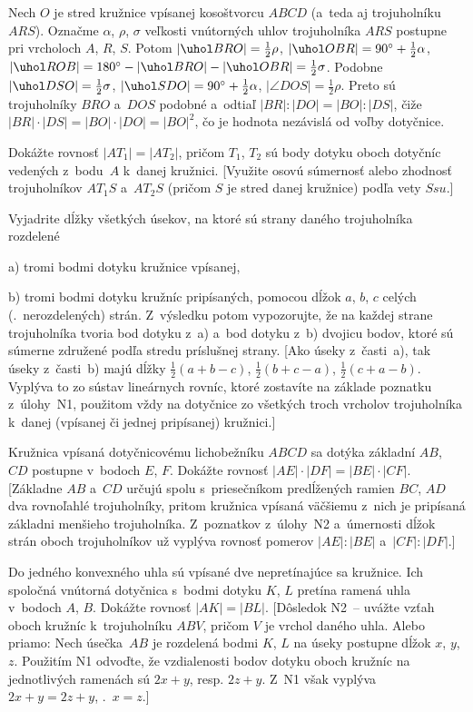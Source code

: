 {\ineriesenie
Nech $O$ je stred kružnice vpísanej kosoštvorcu $ABCD$ (a~teda aj trojuholníku $ARS$). Označme $\alpha$, $\rho$, $\sigma$ veľkosti vnútorných uhlov trojuholníka $ARS$ postupne pri vrcholoch $A$, $R$, $S$. Potom $|\uhol BRO|=\frac12\rho$,
$|\uhol OBR|=90^\circ +\frac12\alpha$, $|\uhol ROB| = 180^\circ -|\uhol BRO| - |\uhol OBR|= \frac12\sigma$. Podobne $|\uhol DSO| = \frac12\sigma$,
$|\uhol SDO| = 90^\circ +\frac12\alpha$, $|\angle DOS| =\frac12\rho$. Preto sú trojuholníky $BRO$  a~$DOS$ podobné a~odtiaľ $|BR|:|DO|=|BO|:|DS|$, čiže $|BR|\cdot |DS|=|BO|\cdot|DO|=|BO|^2$, čo je hodnota nezávislá od voľby dotyčnice.

Dokážte rovnosť $|AT_1|=|AT_2|$, pričom $T_{1}$, $T_{2}$ sú body dotyku
oboch dotyčníc vedených z~bodu~$A$ k~danej kružnici. [Využite osovú
súmernosť alebo zhodnosť trojuholníkov $AT_1S$ a~$AT_2S$ (pričom $S$ je
stred danej kružnice) podľa vety $Ssu$.]

Vyjadrite dĺžky všetkých úsekov, na ktoré sú strany daného
trojuholníka rozdelené
\item{a)} tromi bodmi dotyku kružnice vpísanej,
\item{b)} tromi bodmi dotyku kružníc pripísaných,
\endgraf\indent\egroup
pomocou dĺžok  $a$, $b$, $c$ celých (\tj.~nerozdelených) strán.
Z~výsledku potom vypozorujte, že na každej strane trojuholníka tvoria bod
dotyku z~a) a~bod dotyku z~b) dvojicu bodov, ktoré sú
súmerne združené podľa stredu príslušnej strany.
[Ako úseky z~časti~a), tak úseky z~časti~b) majú dĺžky
$\frac12(a+b-c)$, $\frac12(b+c-a)$, $\frac12(c+a-b)$. Vyplýva to
zo sústav lineárnych rovníc, ktoré zostavíte na základe poznatku
z~úlohy~N1, použitom vždy na dotyčnice zo všetkých troch vrcholov
trojuholníka k~danej (vpísanej či jednej pripísanej) kružnici.]

Kružnica vpísaná dotyčnicovému lichobežníku $ABCD$ sa dotýka
základní $AB$, $CD$ postupne v~bodoch $E$, $F$. Dokážte rovnosť
$|AE|\cdot|DF|=|BE|\cdot|CF|$. [Základne $AB$ a~$CD$ určujú
spolu s~priesečníkom predĺžených ramien $BC$, $AD$ dva rovnoľahlé
trojuholníky, pritom kružnica vpísaná väčšiemu z~nich je pripísaná
základni menšieho trojuholníka. Z~poznatkov z~úlohy~N2
a~úmernosti dĺžok strán oboch trojuholníkov už vyplýva rovnosť pomerov
$|AE|:|BE|$ a~$|CF|:|DF|$.]

\D
Do jedného konvexného uhla sú vpísané dve nepretínajúce sa
kružnice. Ich spoločná vnútorná dotyčnica s~bodmi dotyku $K$, $L$
pretína ramená uhla v~bodoch $A$, $B$. Dokážte rovnosť
$|AK|=|BL|$.
[Dôsledok N2~-- uvážte vzťah oboch kružníc k~trojuholníku $ABV$,
pričom $V$ je vrchol daného uhla.
Alebo priamo:
Nech úsečka~$AB$ je rozdelená bodmi $K$, $L$ na úseky postupne dĺžok
$x$, $y$, $z$. Použitím N1 odvoďte, že vzdialenosti bodov dotyku
oboch kružníc na jednotlivých ramenách sú $2x+y$, resp. $2z+y$.
Z~N1 však vyplýva $2x+y=2z+y$, \tj.~$x=z$.]

}
